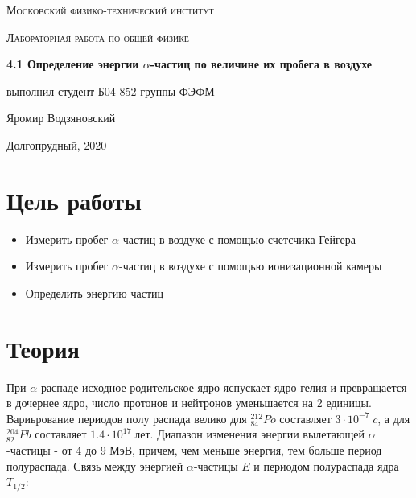 \documentclass[a4paper]{article}
\begin{document}
\graphicspath{ {pictures/} }

\begin{titlepage}
	\centering
	\vspace{5cm}
    {\scshape\LARGE Московский физико-технический институт\par}
	\vspace{5cm}
	{\scshape\Large Лабораторная работа по общей физике \par}
	\vspace{1cm}
    {\huge\bfseries  4.1 Определение энергии $\alpha$-частиц по величине их
    пробега в воздухе \par}
	\vspace{1cm}
	\vfill
    \begin{flushright}
        {\large выполнил студент Б04-852 группы ФЭФМ}\par
        \vspace{0.3cm}
        {\LARGE Яромир Водзяновский}
    \end{flushright}
	\vfill
Долгопрудный, 2020
\end{titlepage}

\pagestyle{fancy} 
\fancyhead[C]{}
\fancyfoot[C]{ \noindent\rule{\textwidth}{0.4pt} \thepage }

\tableofcontents

\newpage



\section{Цель работы}

\begin{itemize}
    \item Измерить пробег $\alpha$-частиц в воздухе с помощью счетсчика Гейгера
    \item Измерить пробег $\alpha$-частиц в воздухе с помощью ионизационной камеры
    \item Определить энергию частиц
\end{itemize}



\section{Теория}

При $\alpha$-распаде исходное родительское ядро яспускает ядро гелия и превращается в дочернее ядро,
число протонов и нейтронов уменьшается на 2 единицы. Вариьрование периодов полу распада велико для 
$_{84}^{212}Po$ составляет $3 \cdot 10^{-7} \; c$, а для $_{82}^{204}Pb$ составляет $1.4 \cdot 10^{17} \; лет$. 
Диапазон изменения энергии вылетающей $\alpha$-частицы - от 4 до 9 МэВ, причем, чем меньше энергия, 
тем больше период полураспада. Связь между энергией $\alpha$-частицы $E$ и периодом полураспада ядра
$T_{1/2}$:
\end{document}
